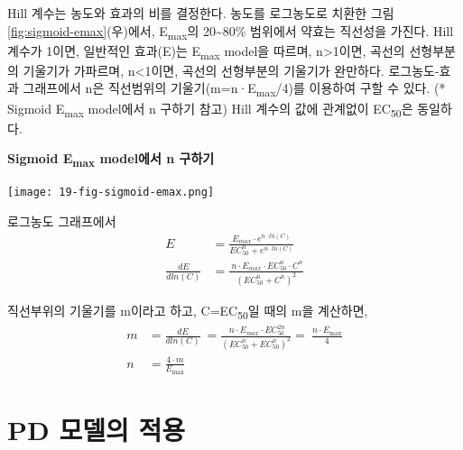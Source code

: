 \documentclass[
  10pt,
  krantz2,
  a4paper]{krantz}
\makeatletter
\newenvironment{kframe}{%
\medskip{}
\setlength{\fboxsep}{.8em}
 \def\at@end@of@kframe{}%
 \ifinner\ifhmode%
  \def\at@end@of@kframe{\end{minipage}}%
  \begin{minipage}{\columnwidth}%
 \fi\fi%
 \def\FrameCommand##1{\hskip\@totalleftmargin \hskip-\fboxsep
 \colorbox{shadecolor}{##1}\hskip-\fboxsep
     \hskip-\linewidth \hskip-\@totalleftmargin \hskip\columnwidth}%
 \MakeFramed {\advance\hsize-\width
   \@totalleftmargin\z@ \linewidth\hsize
   \@setminipage}}%
 {\par\unskip\endMakeFramed%
 \at@end@of@kframe}
\newenvironment{rmdblock}[1]
  {
  \begin{itemize}
  \renewcommand{\labelitemi}{
    \raisebox{-.7\height}[0pt][0pt]{
      {\setkeys{Gin}{width=3em,keepaspectratio}\texttt{[image: images/\#1]}}
    }
  }
  \setlength{\fboxsep}{1em}
  \begin{kframe}
  \item
  }
  {
  \end{kframe}
  \end{itemize}
  }
\newenvironment{rmdtip}
  {\begin{rmdblock}{tip}}
  {\end{rmdblock}}
\theoremstyle{definition}
\theoremstyle{definition}
\theoremstyle{definition}
\theoremstyle{remark}
\makeatother
\begin{document}
Hill 계수는 농도와 효과의 비를 결정한다. 농도를 로그농도로 치환한 그림 \ref{fig:sigmoid-emax}(우)에서, E\textsubscript{max}의 20\textasciitilde80\% 범위에서 약효는 직선성을 가진다. Hill 계수가 1이면, 일반적인 효과(E)는 E\textsubscript{max} model을 따르며, n\textgreater1이면, 곡선의 선형부분의 기울기가 가파르며, n\textless1이면, 곡선의 선형부분의 기울기가 완만하다. 로그농도-효과 그래프에서 n은 직선범위의 기울기(m=n·E\textsubscript{max}/4)를 이용하여 구할 수 있다. (* Sigmoid E\textsubscript{max} model에서 n 구하기 참고) Hill 계수의 값에 관계없이 EC\textsubscript{50}은 동일하다.

\begin{rmdtip}
\begin{rmdtip}

\textbf{Sigmoid E\textsubscript{max} model에서 n 구하기}

\texttt{[image: 19-fig-sigmoid-emax.png]}

로그농도 그래프에서
\begin{equation}
\begin{split}
E &= \frac{E_{max} \cdot e^{n \cdot ln(C)}}{EC_{50}^{n} + e^{n \cdot ln(C)}} \\
\frac{dE}{dln ( C )} &= \frac{\ n \cdot E_{max}  \cdot EC_{50}^{n} \cdot C^{n}}{\left( EC_{50}^{n} + C^{n} \right)^{2}}
\end{split}
\label{eq:log-conc}
\end{equation}

직선부위의 기울기를 m이라고 하고, C=EC\textsubscript{50}일 때의 m을 계산하면,
\begin{equation}
\begin{split}
  m &= \frac{{dE}}{{dln}\left( C \right)}\ = \frac{\ n \cdot E_{max } \cdot {EC}_{50}^{2n}}{\left( {EC}_{50}^{n} + {EC}_{50}^{n} \right)^{2}} = \ \frac{n \cdot E_{\max}}{4} \\
  n &= \frac{4 \cdot m}{E_{\max}}
\end{split}
\label{eq:ec50-m}
\end{equation}

\end{rmdtip}
\end{rmdtip}

\hypertarget{pd-uxbaa8uxb378uxc758-uxc801uxc6a9}{%
\section{PD 모델의 적용}\label{pd-uxbaa8uxb378uxc758-uxc801uxc6a9}}
\end{document}
